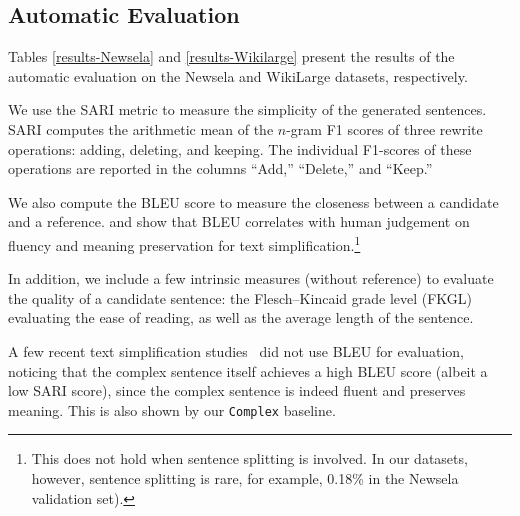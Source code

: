 \documentclass[11pt,a4paper]{article}
\begin{document}
\subsection{Automatic Evaluation}
\label{ss:results}


Tables \ref{results-Newsela} and \ref{results-Wikilarge} present the results of the automatic evaluation on the Newsela and WikiLarge datasets, respectively.


We use the SARI metric \cite{xu-etal-2016-optimizing} to measure the simplicity of the generated sentences. SARI computes the arithmetic mean of the $n$-gram F1 scores of three rewrite operations: adding, deleting, and keeping. The individual F1-scores of these operations are reported in the columns ``Add,'' ``Delete,'' and ``Keep.''

We also compute the BLEU score \cite{papineni2002bleu} to measure the closeness between a candidate and a reference.  and  show that BLEU correlates with human judgement on fluency and meaning preservation for text simplification.\footnote{This does not hold when sentence splitting is involved. In our datasets, however, sentence splitting is rare, for example, 0.18\% in the Newsela validation set).}

In addition, we include a few intrinsic measures (without reference) to evaluate the quality of a candidate sentence: the Flesch--Kincaid grade level (FKGL) evaluating the ease of reading, as well as the average length of the sentence.

A few recent text simplification studies~\cite{dong2019editnts, kriz2019complexity} did not use BLEU for evaluation, noticing that the complex sentence itself achieves a high BLEU score (albeit a low SARI score), since the complex sentence is indeed fluent and preserves meaning. This is also shown by our {\tt Complex} baseline.
\end{document}
